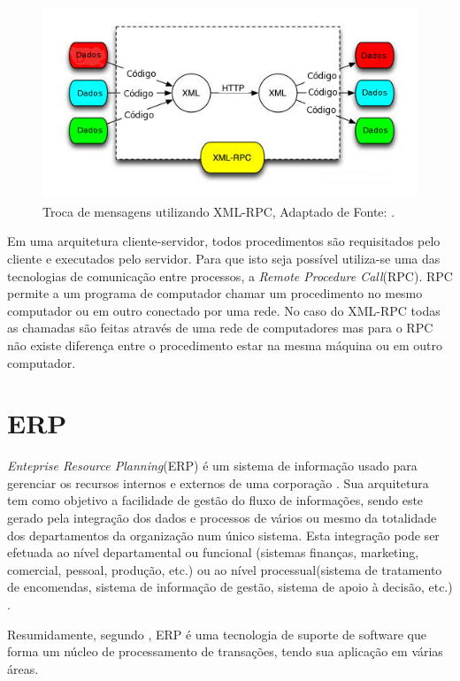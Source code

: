 \begin{figure}[ht]
 \centering
 \includegraphics[scale=0.50,bb=0 0 550 250]{xmlrpc.jpg}
 \caption{Troca de mensagens utilizando XML-RPC, Adaptado de Fonte: \cite{web:xmlrpc}.}
\label{xmlrpc.jpg}
\end{figure}

Em uma arquitetura cliente-servidor, todos procedimentos são requisitados pelo cliente e executados pelo servidor. Para que isto seja possível utiliza-se uma das tecnologias de comunicação entre processos, a \textit{Remote Procedure Call}(RPC). RPC permite a um programa de computador chamar um procedimento no mesmo computador ou em outro conectado por uma rede. No caso do XML-RPC todas as chamadas são feitas através de uma rede de computadores mas para o RPC não existe diferença entre o procedimento estar na mesma máquina ou em outro computador.

\section{ERP}
\textit{Enteprise Resource Planning}(ERP) é um sistema de informação usado para gerenciar os recursos internos e externos de uma corporação \cite{wiki:erp}. Sua arquitetura tem como objetivo a facilidade de gestão do fluxo de informações, sendo este gerado pela integração dos dados e processos de vários ou mesmo da totalidade dos departamentos da organização num único sistema. Esta integração pode ser efetuada ao nível departamental ou funcional (sistemas finanças, marketing, comercial, pessoal, produção, etc.) ou ao nível processual(sistema de tratamento de encomendas, sistema de informação de gestão, sistema de apoio à decisão, etc.) \cite{557044}. 

Resumidamente, segundo \cite{557044}, ERP é uma tecnologia de suporte de software que forma um núcleo de processamento de transações, tendo sua aplicação em várias áreas.

